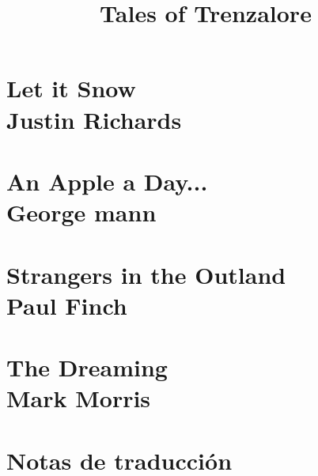 \documentclass[10pt,twoside,openright,a5paper]{book}
\title{Tales of Trenzalore}
\author{}
\date{}
\begin{document}
\pagestyle{plain}

\begin{titlepage}

\end{titlepage}

\maketitle

\tableofcontents

\newpage



\part*{Let it Snow \\ \vspace{2 mm} {\large Justin Richards}}


\part*{An Apple a Day... \\ \vspace{2 mm} {\large George mann}}


\part*{Strangers in the Outland \\ \vspace{2 mm} {\large Paul Finch}}


\part*{The Dreaming \\ \vspace{2 mm} {\large Mark Morris}}


\part*{Notas de traducción}

\end{document}
